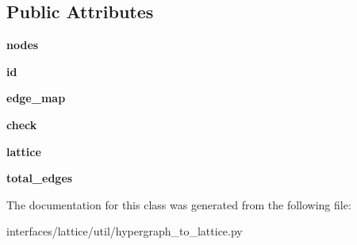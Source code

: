 \subsection*{Public Attributes}
\begin{DoxyCompactItemize}
\item 
\hypertarget{classhypergraph__to__lattice_1_1Graph_a27ba97b60fe59dfcd38dd84ad5771ec8}{
{\bfseries nodes}}
\label{classhypergraph__to__lattice_1_1Graph_a27ba97b60fe59dfcd38dd84ad5771ec8}

\item 
\hypertarget{classhypergraph__to__lattice_1_1Graph_a2f57d378f9cda72a4e375740cc6a4ec1}{
{\bfseries id}}
\label{classhypergraph__to__lattice_1_1Graph_a2f57d378f9cda72a4e375740cc6a4ec1}

\item 
\hypertarget{classhypergraph__to__lattice_1_1Graph_a641408abe14eb2ca59558af8c66a29f0}{
{\bfseries edge\_\-map}}
\label{classhypergraph__to__lattice_1_1Graph_a641408abe14eb2ca59558af8c66a29f0}

\item 
\hypertarget{classhypergraph__to__lattice_1_1Graph_a55f4552a72c8862e879c4bf1c5c591dd}{
{\bfseries check}}
\label{classhypergraph__to__lattice_1_1Graph_a55f4552a72c8862e879c4bf1c5c591dd}

\item 
\hypertarget{classhypergraph__to__lattice_1_1Graph_aa2f03bffcdb31d13b01a0cb2a66fba27}{
{\bfseries lattice}}
\label{classhypergraph__to__lattice_1_1Graph_aa2f03bffcdb31d13b01a0cb2a66fba27}

\item 
\hypertarget{classhypergraph__to__lattice_1_1Graph_a1077f3c24b2e35dfcd277eda332e9180}{
{\bfseries total\_\-edges}}
\label{classhypergraph__to__lattice_1_1Graph_a1077f3c24b2e35dfcd277eda332e9180}

\end{DoxyCompactItemize}


The documentation for this class was generated from the following file:\begin{DoxyCompactItemize}
\item 
interfaces/lattice/util/hypergraph\_\-to\_\-lattice.py\end{DoxyCompactItemize}
